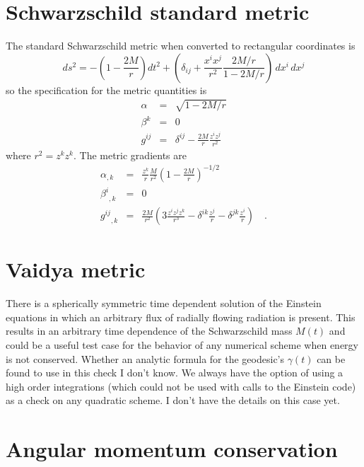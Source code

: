 \section{Schwarzschild standard metric}

    The standard Schwarzschild metric when converted to rectangular
coordinates is
    \begin{equation}\label{eq-Schwstd}
    ds^2 = - \left( 1 -\frac{2 M}{r} \right) dt^2 + \left( \delta_{ij} 
    + \frac{x^i x^j}{r^2} \frac{2M/r}{1-2M/r} \right) \,dx^i\,dx^j
    \end{equation}
    so the specification for the metric quantities is
    \begin{eqnarray}\label{eq-gSchwstd}
    \alpha  & = & \sqrt{1-2M/r}\\
    \beta^k & = & 0 \\
    g^{ij} & = & \delta^{ij} - \frac{2M}{r} \frac{z^i z^j}{r^2} 
    \end{eqnarray}
    where $r^2 = z^k z^k$.
    The metric gradients are
    \begin{eqnarray}\label{eq-dgSchwstd}
    \alpha_{,k}  & = & \frac{z^k}{r} \frac{M}{r^2}
            \left( 1 - \frac{2M}{r} \right)^{-1/2} \\
    {\beta^i}_{,k} & = & 0 \\
    {g^{ij}}_{,k} & = & \frac{2 M}{r^2} 
        \left( 3 \frac{z^i z^j z^k}{r^3}
        -\delta^{ik} \frac{z^j}{r} -\delta^{jk} \frac{z^i}{r} 
        \right) 
    \quad .
    \end{eqnarray}

\section{Vaidya metric}
    There is a spherically symmetric time dependent solution of the
Einstein equations in which an arbitrary flux of radially flowing
radiation is present.  
    This results in an arbitrary time dependence of the Schwarzschild
mass $M(t)$ and could be a useful test case for the behavior of any
numerical scheme when energy is not conserved. 
    Whether an analytic formula for the geodesic's $\gamma(t)$ can be
found to use in this check I don't know. 
    We always have the option of using a high order integrations
(which could not be used with calls to the Einstein code) as a check
on any quadratic scheme.
    I don't have the details on this case yet.

\section{Angular momentum conservation}

